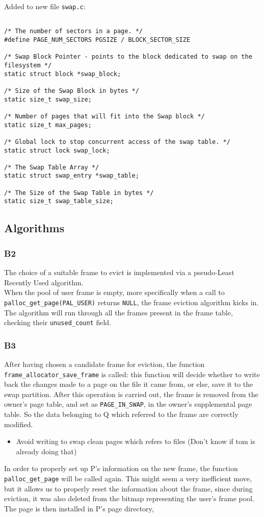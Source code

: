 \documentclass[a4wide, 11pt]{article}
\newcommand{\tx}{\texttt}
\begin{document}
Added to new file \tx{swap.c}:
\begin{verbatim}

/* The number of sectors in a page. */
#define PAGE_NUM_SECTORS PGSIZE / BLOCK_SECTOR_SIZE 

/* Swap Block Pointer - points to the block dedicated to swap on the filesystem */
static struct block *swap_block; 

/* Size of the Swap Block in bytes */
static size_t swap_size;

/* Number of pages that will fit into the Swap block */
static size_t max_pages;         

/* Global lock to stop concurrent access of the swap table. */
static struct lock swap_lock;        

/* The Swap Table Array */
static struct swap_entry *swap_table;

/* The Size of the Swap Table in bytes */
static size_t swap_table_size;
\end{verbatim}


\subsection{Algorithms}
\subsubsection{B2}
The choice of a suitable frame to evict is implemented via a pseudo-Least Recently Used algorithm.\\
 When the pool of user frame is empty, more specifically when a call to \tx{palloc\_get\_page(PAL\_USER)} returns \tx{NULL}, the frame eviction algorithm kicks in. \\The algorithm will run through all the frames present in the frame table, checking their \tx{unused\_count} field. 
 
 

\subsubsection{B3}
After having chosen a candidate frame for eviction, the function \tx{frame\_allocator\_save\_frame} is called: this function will decide whether to write back the changes made to a page on the file it came from, or else, save it to the swap partition. After this operation is carried out, the frame is removed from the owner's page table, and set as \tx{PAGE\_IN\_SWAP}, in the owner's supplemental page table. So the data belonging to Q which referred to the frame are correctly modified.
\begin{itemize}
\item Avoid writing to swap clean pages which refers to files (Don't know if tom is already doing that)
\end{itemize}  
In order to properly set up P's information on the new frame, the function \tx{palloc\_get\_page} will be called again. This might seem a very inefficient move, but it allows us to properly reset the information about the frame, since during eviction, it was also deleted from the bitmap representing the user's frame pool.\\
The page is then installed in P's page directory,   
\end{document}
